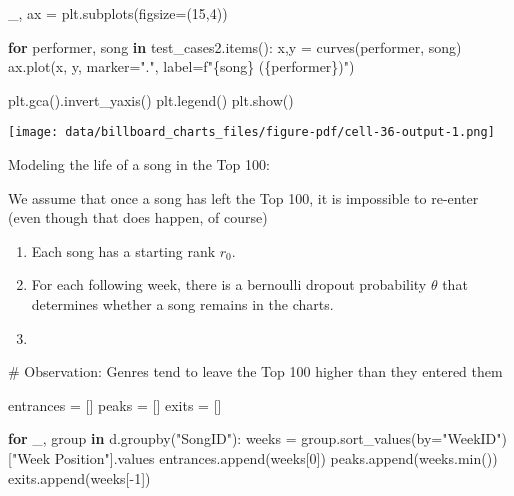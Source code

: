 \documentclass[
  a4paper,
]{scrbook}
\newenvironment{Shaded}{\begin{snugshade}}{\end{snugshade}}
\newcommand{\BuiltInTok}[1]{\textcolor[rgb]{0.00,0.23,0.31}{#1}}
\newcommand{\CommentTok}[1]{\textcolor[rgb]{0.37,0.37,0.37}{#1}}
\newcommand{\ControlFlowTok}[1]{\textcolor[rgb]{0.00,0.23,0.31}{\textbf{#1}}}
\newcommand{\DecValTok}[1]{\textcolor[rgb]{0.68,0.00,0.00}{#1}}
\newcommand{\KeywordTok}[1]{\textcolor[rgb]{0.00,0.23,0.31}{\textbf{#1}}}
\newcommand{\NormalTok}[1]{\textcolor[rgb]{0.00,0.23,0.31}{#1}}
\newcommand{\OperatorTok}[1]{\textcolor[rgb]{0.37,0.37,0.37}{#1}}
\newcommand{\SpecialCharTok}[1]{\textcolor[rgb]{0.37,0.37,0.37}{#1}}
\newcommand{\SpecialStringTok}[1]{\textcolor[rgb]{0.13,0.47,0.30}{#1}}
\newcommand{\StringTok}[1]{\textcolor[rgb]{0.13,0.47,0.30}{#1}}
\providecommand{\tightlist}{%
  \setlength{\itemsep}{0pt}\setlength{\parskip}{0pt}}\usepackage{longtable,booktabs,array}
\begin{document}
\begin{Shaded}
\begin{Highlighting}[]
\NormalTok{\_, ax }\OperatorTok{=}\NormalTok{ plt.subplots(figsize}\OperatorTok{=}\NormalTok{(}\DecValTok{15}\NormalTok{,}\DecValTok{4}\NormalTok{))}

\ControlFlowTok{for}\NormalTok{ performer, song }\KeywordTok{in}\NormalTok{ test\_cases2.items():}
\NormalTok{    x,y }\OperatorTok{=}\NormalTok{ curves(performer, song)}
\NormalTok{    ax.plot(x, y, marker}\OperatorTok{=}\StringTok{"."}\NormalTok{, label}\OperatorTok{=}\SpecialStringTok{f"}\SpecialCharTok{\{}\NormalTok{song}\SpecialCharTok{\}}\SpecialStringTok{ (}\SpecialCharTok{\{}\NormalTok{performer}\SpecialCharTok{\}}\SpecialStringTok{)"}\NormalTok{)}

\NormalTok{plt.gca().invert\_yaxis()}
\NormalTok{plt.legend()}
\NormalTok{plt.show()}
\end{Highlighting}
\end{Shaded}

\texttt{[image: data/billboard\_charts\_files/figure-pdf/cell-36-output-1.png]}

Modeling the life of a song in the Top 100:

We assume that once a song has left the Top 100, it is impossible to
re-enter (even though that does happen, of course)

\begin{enumerate}
\def\labelenumi{\arabic{enumi}.}
\tightlist
\item
  Each song has a starting rank \(r_0\).
\item
  For each following week, there is a bernoulli dropout probability
  \(\theta\) that determines whether a song remains in the charts.
\item
\end{enumerate}

\begin{Shaded}
\begin{Highlighting}[]
\CommentTok{\# Observation: Genres tend to leave the Top 100 higher than they entered them}
\end{Highlighting}
\end{Shaded}

\begin{Shaded}
\begin{Highlighting}[]
\NormalTok{entrances }\OperatorTok{=}\NormalTok{ []}
\NormalTok{peaks }\OperatorTok{=}\NormalTok{ []}
\NormalTok{exits }\OperatorTok{=}\NormalTok{ []}

\ControlFlowTok{for}\NormalTok{ \_, group }\KeywordTok{in}\NormalTok{ d.groupby(}\StringTok{"SongID"}\NormalTok{):}
\NormalTok{    weeks }\OperatorTok{=}\NormalTok{ group.sort\_values(by}\OperatorTok{=}\StringTok{"WeekID"}\NormalTok{)[}\StringTok{"Week Position"}\NormalTok{].values}
\NormalTok{    entrances.append(weeks[}\DecValTok{0}\NormalTok{])}
\NormalTok{    peaks.append(weeks.}\BuiltInTok{min}\NormalTok{())}
\NormalTok{    exits.append(weeks[}\OperatorTok{{-}}\DecValTok{1}\NormalTok{])}
\end{Highlighting}
\end{Shaded}
\end{document}

